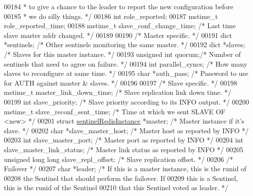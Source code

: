 \begin{DoxyCode}
00184 \textcolor{comment}{     * to give a chance to the leader to report the new configuration before}
00185 \textcolor{comment}{     * we do silly things. */}
00186     \textcolor{keywordtype}{int} role\_reported;
00187     mstime\_t role\_reported\_time;
00188     mstime\_t slave\_conf\_change\_time; \textcolor{comment}{/* Last time slave master addr changed. */}
00189 
00190     \textcolor{comment}{/* Master specific. */}
00191     dict *sentinels;    \textcolor{comment}{/* Other sentinels monitoring the same master. */}
00192     dict *slaves;       \textcolor{comment}{/* Slaves for this master instance. */}
00193     \textcolor{keywordtype}{unsigned} \textcolor{keywordtype}{int} quorum;\textcolor{comment}{/* Number of sentinels that need to agree on failure. */}
00194     \textcolor{keywordtype}{int} parallel\_syncs; \textcolor{comment}{/* How many slaves to reconfigure at same time. */}
00195     \textcolor{keywordtype}{char} *auth\_pass;    \textcolor{comment}{/* Password to use for AUTH against master & slaves. */}
00196 
00197     \textcolor{comment}{/* Slave specific. */}
00198     mstime\_t master\_link\_down\_time; \textcolor{comment}{/* Slave replication link down time. */}
00199     \textcolor{keywordtype}{int} slave\_priority; \textcolor{comment}{/* Slave priority according to its INFO output. */}
00200     mstime\_t slave\_reconf\_sent\_time; \textcolor{comment}{/* Time at which we sent SLAVE OF <new> */}
00201     \textcolor{keyword}{struct} \hyperlink{structsentinelRedisInstance}{sentinelRedisInstance} *master; \textcolor{comment}{/* Master instance if it's slave. */}
00202     \textcolor{keywordtype}{char} *slave\_master\_host;    \textcolor{comment}{/* Master host as reported by INFO */}
00203     \textcolor{keywordtype}{int} slave\_master\_port;      \textcolor{comment}{/* Master port as reported by INFO */}
00204     \textcolor{keywordtype}{int} slave\_master\_link\_status; \textcolor{comment}{/* Master link status as reported by INFO */}
00205     \textcolor{keywordtype}{unsigned} \textcolor{keywordtype}{long} \textcolor{keywordtype}{long} slave\_repl\_offset; \textcolor{comment}{/* Slave replication offset. */}
00206     \textcolor{comment}{/* Failover */}
00207     \textcolor{keywordtype}{char} *leader;       \textcolor{comment}{/* If this is a master instance, this is the runid of}
00208 \textcolor{comment}{                           the Sentinel that should perform the failover. If}
00209 \textcolor{comment}{                           this is a Sentinel, this is the runid of the Sentinel}
00210 \textcolor{comment}{                           that this Sentinel voted as leader. */}

\end{DoxyCode}
